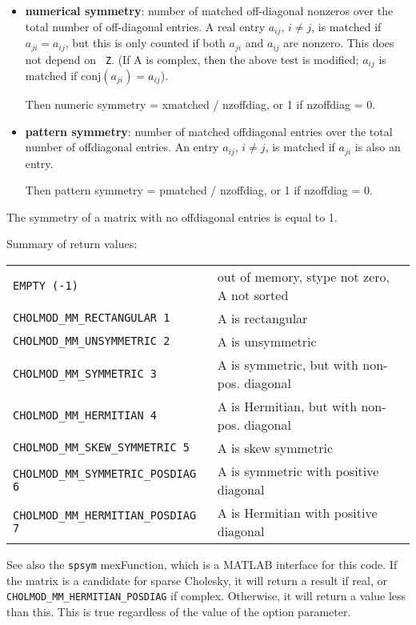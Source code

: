 \documentclass[11pt]{article}
\begin{document}
\begin{itemize}

    \item {\bf numerical symmetry}: number of matched off-diagonal nonzeros over
        the total number of off-diagonal entries.  A real entry $a_{ij}$,  $i
        \ne j$, is matched if $a_{ji} = a_{ij}$, but this is only counted if
        both $a_{ji}$ and $a_{ij}$ are nonzero.  This does not depend on {\tt
        Z}.  (If A is complex, then the above test is modified; $a_{ij}$ is
        matched if $\mbox{conj}(a_{ji}) = a_{ij}$).

        Then numeric symmetry = xmatched / nzoffdiag, or 1 if nzoffdiag = 0.

    \item {\bf pattern symmetry}: number of matched offdiagonal entries over
        the total number of offdiagonal entries.  An entry $a_{ij}$, $i \ne j$,
        is matched if $a_{ji}$ is also an entry.

        Then pattern symmetry = pmatched / nzoffdiag, or 1 if nzoffdiag = 0.
\end{itemize}

The symmetry of a matrix with no offdiagonal entries is equal to 1.

Summary of return values:

\begin{tabular}{ll}
{\tt EMPTY (-1)}                 & out of memory, stype not zero, A not sorted \\
{\tt CHOLMOD\_MM\_RECTANGULAR 1} & A is rectangular \\
{\tt CHOLMOD\_MM\_UNSYMMETRIC 2} & A is unsymmetric \\
{\tt CHOLMOD\_MM\_SYMMETRIC 3}   & A is symmetric, but with non-pos. diagonal \\
{\tt CHOLMOD\_MM\_HERMITIAN 4}   & A is Hermitian, but with non-pos. diagonal \\
{\tt CHOLMOD\_MM\_SKEW\_SYMMETRIC 5}    & A is skew symmetric \\
{\tt CHOLMOD\_MM\_SYMMETRIC\_POSDIAG 6} & A is symmetric with positive diagonal \\
{\tt CHOLMOD\_MM\_HERMITIAN\_POSDIAG 7} & A is Hermitian with positive diagonal \\
\end{tabular}

See also the {\tt spsym} mexFunction, which is a MATLAB interface for this
code.  If the matrix is a candidate for sparse Cholesky, it will return a
result  if real, or {\tt
CHOLMOD\_MM\_HERMITIAN\_POSDIAG} if complex.  Otherwise, it will return a value
less than this.  This is true regardless of the value of the option parameter.
\end{document}

